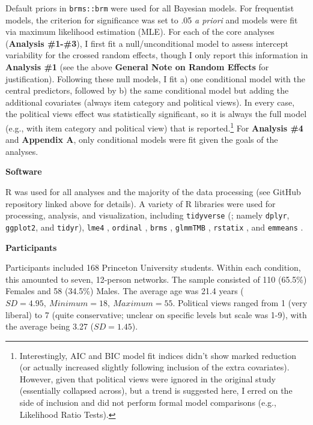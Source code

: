 \documentclass[12pt]{article}  %
\begin{document}
Default priors in \verb+brms::brm+ were used for all Bayesian models. For frequentist models, the criterion for significance was set to .05 \textit{a priori} and models were fit via maximum likelihood estimation (MLE). For each of the core analyses (\textbf{Analysis \#1-\#3}), I first fit a null/unconditional model to assess intercept variability for the crossed random effects, though I only report this information in \textbf{Analysis \#1} (see the above \textbf{General Note on Random Effects} for justification). Following these null models, I fit a) one conditional model with the central predictors, followed by b) the same conditional model but adding the additional covariates (always item category and political views). In every case, the political views effect was statistically significant, so it is always the full model (e.g., with item category and political view) that is reported.\footnote{Interestingly, AIC and BIC model fit indices didn't show marked reduction (or actually increased slightly following inclusion of the extra covariates). However, given that political views were ignored in the original study (essentially collapsed across), but a trend is suggested here, I erred on the side of inclusion and did not perform formal model comparisons (e.g., Likelihood Ratio Tests).} For \textbf{Analysis \#4} and \textbf{Appendix A}, only conditional models were fit given the goals of the analyses.

\noindent\textbf{Software}

R \parencite{ritself} was used for all analyses and the majority of the data processing (see GitHub repository linked above for details). A variety of R libraries were used for processing, analysis, and visualization, including \verb+tidyverse+ (\textcite{tidyverse}; namely \verb+dplyr+, \verb+ggplot2+, and \verb+tidyr+), \verb+lme4+ \parencite{lme4}, \verb+ordinal+ \parencite{ordinal}, \verb+brms+ \parencite{brm1, brm2}, \verb+glmmTMB+ \parencite{glmmtmb}, \verb+rstatix+ \parencite{rstatix}, and \verb+emmeans+ \parencite{emmeanse}.

\noindent\textbf{Participants}

Participants included 168 Princeton University students. Within each condition, this amounted to seven, 12-person networks. The sample consisted of 110 (65.5\%) Females and 58 (34.5\%) Males. The average age was 21.4 years ($SD = 4.95,\:Minimum = 18,\:Maximum = 55$. Political views ranged from 1 (very liberal) to 7 (quite conservative; unclear on specific levels but scale was 1-9), with the average being 3.27 ($SD = 1.45$).
\end{document}
